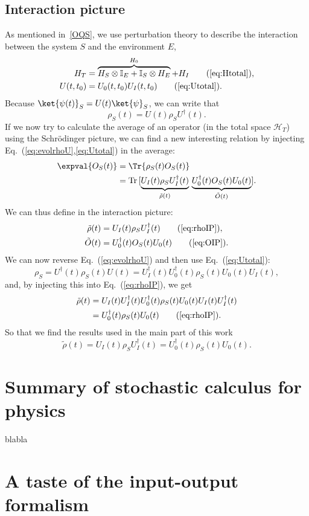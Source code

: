 \subsection{Interaction picture}\noindent
As mentioned in~\ref{OQS}, we use perturbation theory to describe the interaction between the system $S$ and the environment $E$,
\begin{align}
    H_T &= \overbrace{H_S\otimes\mathbb{I}_E+\mathbb{I}_S\otimes H_E}^{H_0}+H_I\tag{\ref{eq:Htotal}},\\
    U(t,t_0) &= U_0(t,t_0)U_I(t,t_0)\tag{\ref{eq:Utotal}}.
\end{align}
Because $\ket{\psi(t)}_S=U(t)\ket{\psi}_S$, we can write that
\begin{equation}\label{eq:evolrhoU}
    \rho_S(t) = U(t)\rho_{S}U^\dagger(t).
\end{equation}
If we now try to calculate the average of an operator (in the total space $\mathcal{H}_T$) using the Schrödinger picture, we can find a new interesting relation by injecting Eq.~(\ref{eq:evolrhoU},\ref{eq:Utotal}) in the average:
\begin{align*}
    \expval{O_S(t)} &= \Tr{\rho_{S}(t)O_S(t)}\\
    &= \mathrm{Tr}\,[\underbrace{U_I(t)\rho_{S}U_I^\dagger(t)}_{\tilde{\rho}(t)}\,\underbrace{U_0^\dagger(t)O_S(t)U_0(t)}_{\tilde{O}(t)}].
\end{align*}
We can thus define in the interaction picture:
\begin{align}
    \tilde{\rho}(t)&=U_I(t)\rho_{S}U_I^\dagger(t)\tag{\ref{eq:rhoIP}},\\
    \tilde{O}(t) &= U_0^\dagger(t)O_S(t)U_0(t)\tag{\ref{eq:OIP}}.
\end{align}
We can now reverse Eq.~(\ref{eq:evolrhoU}) and then use Eq.~(\ref{eq:Utotal}):
\begin{equation*}
    \rho_S = U^\dagger(t)\rho_S(t)U(t) = U_I^\dagger(t)U^\dagger_0(t)\rho_S(t)U_0(t)U_I(t),
\end{equation*}
and, by injecting this into Eq.~(\ref{eq:rhoIP}), we get
\begin{align}
    \tilde{\rho}(t) &= U_I(t)U_I^\dagger(t)U^\dagger_0(t)\rho_S(t)U_0(t)U_I(t)U^\dagger_I(t)\nonumber\\
    &= U^\dagger_0(t)\rho_S(t)U_0(t)\tag{\ref{eq:rhoIP}}.
\end{align}
So that we find the results used in the main part of this work
\begin{equation}
    \boxed{\tilde{\rho}(t)=U_I(t)\rho_{S}U_I^\dagger(t)= U^\dagger_0(t)\rho_S(t)U_0(t)}.
\end{equation}

\newpage
\section{Summary of stochastic calculus for physics}
blabla

\newpage
\section{A taste of the input-output formalism}\label{ann:IOF}